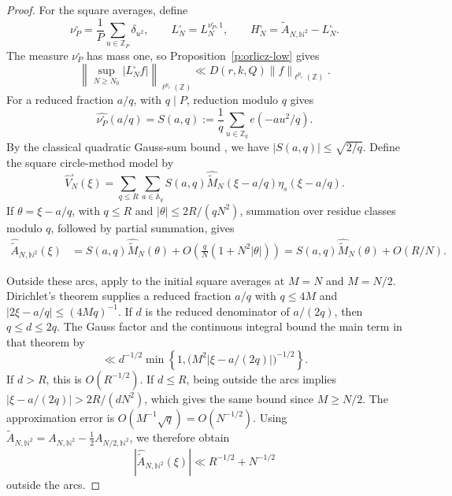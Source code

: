 \documentclass[12pt,reqno]{amsart}
\numberwithin{equation}{section}
\theoremstyle{definition}
\theoremstyle{remark}
\begin{document}
\begin{proof}
For the square averages, define
\[
 \nu_P^\square
 =
 \frac1P\sum_{u\in\mathbb Z_P}\delta_{u^2},
 \qquad
 L_N^\square=L_N^{\nu_P^\square,1},
 \qquad
 H_N^\square=\widetilde A_{N,\mathbb N^2}-L_N^\square.
\]
The measure \(\nu_P^\square\) has mass one, so
Proposition~\ref{p:orlicz-low} gives
\[
 \left\|
 \sup_{N\geq N_0}|L_N^\square f|
 \right\|_{\ell^{p_r}(\mathbb Z)}
 \ll D(r,k,Q)\|f\|_{\ell^{p_r}(\mathbb Z)}.
\]
For a reduced fraction \(a/q\), with \(q\mid P\), reduction
modulo \(q\) gives
\[
 \widehat{\nu_P^\square}(a/q)
 =
 S(a,q)
 :=
 \frac1q\sum_{u\in\mathbb Z_q}e(-au^2/q).
\]
By the classical quadratic Gauss-sum bound
\cite[Section~3]{iwaniec}, we have
\(|S(a,q)|\leq\sqrt{2/q}\).
Define the square circle-method model by
\[
 \widehat V_N^\square(\xi)
 =
 \sum_{q\leq R}\sum_{a\in\mathbb A_q}
 S(a,q)\widehat{\widetilde M}_N(\xi-a/q)
 \eta_s(\xi-a/q).
\]
If \(\theta=\xi-a/q\), with \(q\leq R\) and
\(|\theta|\leq2R/(qN^2)\), summation over residue classes modulo
\(q\), followed by partial summation, gives
\begin{align*}
 \widehat{\widetilde A}_{N,\mathbb N^2}(\xi)
 &=
 S(a,q)\widehat{\widetilde M}_N(\theta)
 +O\left(\frac qN(1+N^2|\theta|)\right)=
 S(a,q)\widehat{\widetilde M}_N(\theta)+O(R/N).
\end{align*}

Outside these arcs, apply \cite[Theorem~3.1]{LHF} to the initial
square averages at \(M=N\) and \(M=N/2\).
Dirichlet's theorem supplies a reduced fraction \(a/q\) with
\(q\leq4M\) and \(|2\xi-a/q|\leq(4Mq)^{-1}\).
If \(d\) is the reduced denominator of \(a/(2q)\), then
\(q\leq d\leq2q\).
The Gauss factor and the continuous integral bound the main
term in that theorem by
\[
 \ll
 d^{-1/2}
 \min\left\{1,
 \bigl(M^2|\xi-a/(2q)|\bigr)^{-1/2}\right\}.
\]
If \(d>R\), this is \(O(R^{-1/2})\).
If \(d\leq R\), being outside the arcs implies
\(|\xi-a/(2q)|>2R/(dN^2)\), which gives the same bound since
\(M\geq N/2\).
The approximation error is
\(O(M^{-1}\sqrt q)=O(N^{-1/2})\).
Using
\(\widetilde A_{N,\mathbb N^2}
 =A_{N,\mathbb N^2}-\frac12A_{N/2,\mathbb N^2}\),
we therefore obtain
\[
 |\widehat{\widetilde A}_{N,\mathbb N^2}(\xi)|
 \ll R^{-1/2}+N^{-1/2}
\]
outside the arcs.


\end{proof}
\end{document}
